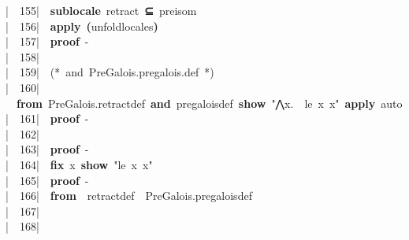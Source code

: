 \documentclass{article}
\newcommand{\syntaxCOMMENTA}[1]{\textcolor[rgb]{0.8,0.0,0.0}{#1}}
\newcommand{\syntaxKEYWORDA}[1]{\textcolor[rgb]{0.0,0.4,0.6}{\textbf{#1}}}
\newcommand{\syntaxKEYWORDB}[1]{\textcolor[rgb]{0.0,0.6,0.4}{\textbf{#1}}}
\newcommand{\syntaxKEYWORDC}[1]{\textcolor[rgb]{0.0,0.6,1.0}{\textbf{#1}}}
\newcommand{\syntaxLITERALA}[1]{\textcolor[rgb]{1.0,0.0,0.8}{#1}}
\newcommand{\syntaxOPERATOR}[1]{\textcolor[rgb]{0.0,0.0,0.0}{\textbf{#1}}}
\newcommand{\syntaxCOMMENTA}[1]{\textcolor[rgb]{0.8,0.0,0.0}{#1}}
\newcommand{\syntaxKEYWORDA}[1]{\textcolor[rgb]{0.0,0.4,0.6}{\textbf{#1}}}
\newcommand{\syntaxKEYWORDB}[1]{\textcolor[rgb]{0.0,0.6,0.4}{\textbf{#1}}}
\newcommand{\syntaxKEYWORDC}[1]{\textcolor[rgb]{0.0,0.6,1.0}{\textbf{#1}}}
\newcommand{\syntaxLITERALA}[1]{\textcolor[rgb]{1.0,0.0,0.8}{#1}}
\newcommand{\syntaxOPERATOR}[1]{\textcolor[rgb]{0.0,0.0,0.0}{\textbf{#1}}}
\newcommand{\syntaxCOMMENTA}[1]{\textcolor[rgb]{0.8,0.0,0.0}{#1}}
\newcommand{\syntaxKEYWORDA}[1]{\textcolor[rgb]{0.0,0.4,0.6}{\textbf{#1}}}
\newcommand{\syntaxKEYWORDB}[1]{\textcolor[rgb]{0.0,0.6,0.4}{\textbf{#1}}}
\newcommand{\syntaxKEYWORDC}[1]{\textcolor[rgb]{0.0,0.6,1.0}{\textbf{#1}}}
\newcommand{\syntaxLITERALA}[1]{\textcolor[rgb]{1.0,0.0,0.8}{#1}}
\newcommand{\syntaxOPERATOR}[1]{\textcolor[rgb]{0.0,0.0,0.0}{\textbf{#1}}}
\newcommand{\syntaxCOMMENTA}[1]{\textcolor[rgb]{0.8,0.0,0.0}{\textbf{#1}}}
\newcommand{\syntaxKEYWORDA}[1]{\textcolor[rgb]{0.0,0.4,0.6}{#1}}
\newcommand{\syntaxKEYWORDB}[1]{\textcolor[rgb]{0.0,0.6,0.4}{#1}}
\newcommand{\syntaxKEYWORDC}[1]{\textcolor[rgb]{0.0,0.6,1.0}{#1}}
\newcommand{\syntaxLITERALA}[1]{\textcolor[rgb]{1.0,0.0,0.8}{\textbf{#1}}}
\newcommand{\syntaxOPERATOR}[1]{\textcolor[rgb]{0.0,0.0,0.0}{#1}}
\newcommand{\syntaxCOMMENTA}[1]{\textcolor[rgb]{0.8,0.0,0.0}{#1}}
\newcommand{\syntaxKEYWORDA}[1]{\textcolor[rgb]{0.0,0.4,0.6}{\textbf{#1}}}
\newcommand{\syntaxKEYWORDB}[1]{\textcolor[rgb]{0.0,0.6,0.4}{\textbf{#1}}}
\newcommand{\syntaxKEYWORDC}[1]{\textcolor[rgb]{0.0,0.6,1.0}{\textbf{#1}}}
\newcommand{\syntaxLITERALA}[1]{\textcolor[rgb]{1.0,0.0,0.8}{#1}}
\newcommand{\syntaxOPERATOR}[1]{\textcolor[rgb]{0.0,0.0,0.0}{\textbf{#1}}}
\newcommand{\syntaxCOMMENTA}[1]{\textcolor[rgb]{0.8,0.0,0.0}{#1}}
\newcommand{\syntaxKEYWORDA}[1]{\textcolor[rgb]{0.0,0.4,0.6}{\textbf{#1}}}
\newcommand{\syntaxKEYWORDB}[1]{\textcolor[rgb]{0.0,0.6,0.4}{\textbf{#1}}}
\newcommand{\syntaxKEYWORDC}[1]{\textcolor[rgb]{0.0,0.6,1.0}{\textbf{#1}}}
\newcommand{\syntaxLITERALA}[1]{\textcolor[rgb]{1.0,0.0,0.8}{#1}}
\newcommand{\syntaxOPERATOR}[1]{\textcolor[rgb]{0.0,0.0,0.0}{\textbf{#1}}}
\newcommand{\syntaxCOMMENTA}[1]{\textcolor[rgb]{0.0,0.0,0.0}{#1}}
\newcommand{\syntaxKEYWORDA}[1]{\textcolor[rgb]{0.0,0.0,0.0}{#1}}
\newcommand{\syntaxKEYWORDB}[1]{\textcolor[rgb]{0.0,0.0,0.0}{#1}}
\newcommand{\syntaxKEYWORDC}[1]{\textcolor[rgb]{0.0,0.0,0.0}{#1}}
\newcommand{\gutter}[1]{\textcolor[rgb]{0,0,0}{{|}#1}}
\newcommand{\gutterH}[1]{\textcolor[rgb]{1,0,0}{{|}#1}}
\begin{document}
\gutterH{\ \ 155{|}\ }{\ }\syntaxKEYWORDA{sublocale}{\ }retract{\ }\syntaxOPERATOR{⊆}{\ }pre\usebox{\underscorebox}isom\hspace*{\fill}\\
\gutter{\ \ 156{|}\ }{\ }\syntaxKEYWORDA{apply}{\ }\syntaxOPERATOR{(}unfold\usebox{\underscorebox}locales\syntaxOPERATOR{)}\hspace*{\fill}\\
\gutter{\ \ 157{|}\ }{\ }\syntaxKEYWORDA{proof}{\ }{-}\hspace*{\fill}\\
\gutter{\ \ 158{|}\ }{\ }\hspace*{\fill}\\
\gutter{\ \ 159{|}\ }{\ }\syntaxCOMMENTA{(*{\ }and{\ }PreGalois.pre\usebox{\underscorebox}galois.def{\ }*)}\hspace*{\fill}\\
\gutterH{\ \ 160{|}\ }{\ }\syntaxKEYWORDA{from}{\ }PreGalois.retract\usebox{\underscorebox}def{\ }\syntaxKEYWORDB{and}{\ }pre\usebox{\underscorebox}galois\usebox{\underscorebox}def{\ }\syntaxKEYWORDC{show}{\ }\syntaxLITERALA{"⋀x.{\ }{\ }le{\ }x{\ }x"}{\ }\syntaxKEYWORDA{apply}{\ }auto\hspace*{\fill}\\
\gutter{\ \ 161{|}\ }{\ }\syntaxKEYWORDA{proof}{\ }{-}\hspace*{\fill}\\
\gutter{\ \ 162{|}\ }{\ }{\ }\hspace*{\fill}\\
\gutter{\ \ 163{|}\ }{\ }\syntaxKEYWORDA{proof}{\ }{-}\hspace*{\fill}\\
\gutter{\ \ 164{|}\ }{\ }\syntaxKEYWORDC{fix}{\ }x{\ }\syntaxKEYWORDC{show}{\ }\syntaxLITERALA{"le{\ }x{\ }x"}\hspace*{\fill}\\
\gutterH{\ \ 165{|}\ }{\ }\syntaxKEYWORDA{proof}{\ }{-}\hspace*{\fill}\\
\gutter{\ \ 166{|}\ }{\ }\syntaxKEYWORDA{from}{\ }{\ }retract\usebox{\underscorebox}def{\ }{\ }PreGalois.pre\usebox{\underscorebox}galois\usebox{\underscorebox}def\hspace*{\fill}\\
\gutter{\ \ 167{|}\ }{\ }\hspace*{\fill}\\
\gutter{\ \ 168{|}\ }{\ }\hspace*{\fill}\\
\end{document}

